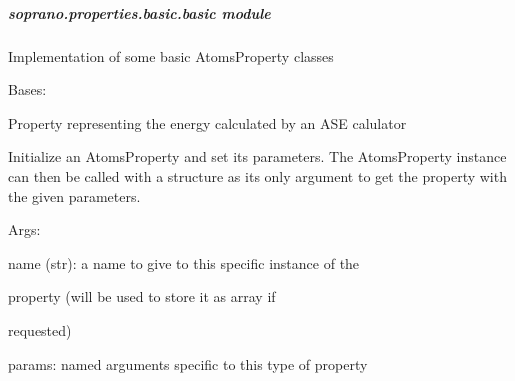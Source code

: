 \documentclass[letterpaper,10pt,english]{sphinxmanual}
\begin{document}
\subparagraph{soprano.properties.basic.basic module}
\label{doctree/soprano.properties.basic.basic::doc}\label{doctree/soprano.properties.basic.basic:module-soprano.properties.basic.basic}\label{doctree/soprano.properties.basic.basic:soprano-properties-basic-basic-module}
Implementation of some basic AtomsProperty classes

\begin{fulllineitems}
\label{doctree/soprano.properties.basic.basic:soprano.properties.basic.basic.CalcEnergy}
Bases: {\hyperref[doctree/soprano.properties.atomsproperty:soprano.properties.atomsproperty.AtomsProperty]{\emph{}}}

Property representing the energy calculated by an ASE calulator

Initialize an AtomsProperty and set its parameters.
The AtomsProperty instance can then be called with a structure as its
only argument to get the property with the given parameters.

\begin{DUlineblock}{0em}
\item[] Args:
\item[]
\begin{DUlineblock}{\DUlineblockindent}
\item[] name (str): a name to give to this specific instance of the
\item[]
\begin{DUlineblock}{\DUlineblockindent}
\item[] property (will be used to store it as array if
\item[] requested)
\end{DUlineblock}
\item[] params: named arguments specific to this type of property
\end{DUlineblock}
\end{DUlineblock}

\begin{fulllineitems}
\label{doctree/soprano.properties.basic.basic:soprano.properties.basic.basic.CalcEnergy.default_name}
\end{fulllineitems}


\end{fulllineitems}
\end{document}
